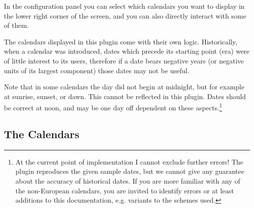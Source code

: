 In the configuration panel you can select which calendars you want to
display in the lower right corner of the screen, and you can also directly
interact with some of them.

The calendars displayed in this plugin come with their own
logic. Historically, when a calendar was introduced, dates which
precede its starting point (era) were of little interest to its users,
therefore if a date bears negative years (or negative units of its
largest component) those dates may not be useful.

Note that in some calendars the day did not begin at midnight, but for
example at sunrise, sunset, or dawn. This cannot be reflected in this
plugin. Dates should be correct at noon, and may be one day off
dependent on these aspects.\footnote{At the current point of
  implementation I cannot exclude further errors! The plugin
  reproduces the given sample dates, but we cannot give any guarantee
  about the accuracy of historical dates. If you are more familiar
  with any of the non-European calendars, you are invited to identify
  errors or at least additions to this documentation, e.g. variants to
  the schemes used.}

\subsection{The Calendars}
